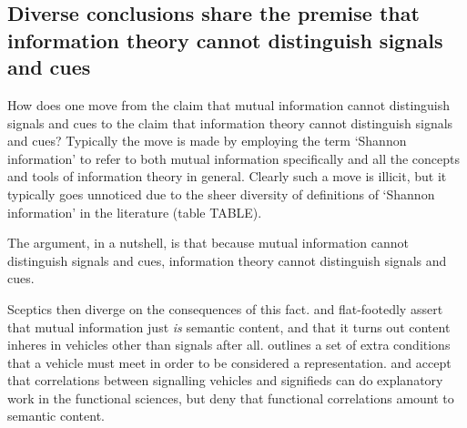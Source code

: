 
\subsection{Diverse conclusions share the premise that information theory cannot distinguish signals and cues}

How does one move from the claim that mutual information cannot distinguish signals and cues to the claim that information theory cannot distinguish signals and cues?
Typically the move is made by employing the term `Shannon information' to refer to both mutual information specifically and all the concepts and tools of information theory in general.
Clearly such a move is illicit, but it typically goes unnoticed due to the sheer diversity of definitions of `Shannon information' in the literature (table TABLE).



The argument, in a nutshell, is that because mutual information cannot distinguish signals and cues, information theory cannot distinguish signals and cues.

Sceptics then diverge on the consequences of this fact.
\citet{skyrms2010signals} and \citet{isaac2018semantics} flat-footedly assert that mutual information just \textit{is} semantic content, and that it turns out content inheres in vehicles other than signals after all.
\citet[SECTION]{shea2018representation} outlines a set of extra conditions that a vehicle must meet in order to be considered a representation. 
\citet{lean2014shannon} and \citet[CHAPTER]{hutto2017evolving} accept that correlations between signalling vehicles and signifieds can do explanatory work in the functional sciences, but deny that functional correlations amount to semantic content.

